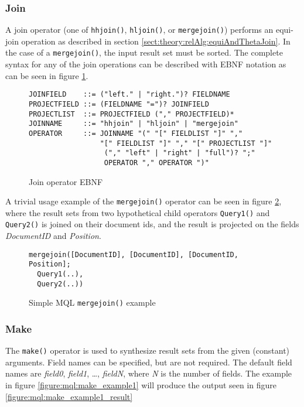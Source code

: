 \subsubsection{Join}
A join operator (one of \texttt{hhjoin()}, \texttt{hljoin()}, or
\texttt{mergejoin()}) performs an equi-join operation as described in section
\ref{sect:theory:relAlg:equiAndThetaJoin}. In the case of a
\texttt{mergejoin()}, the input result set must be sorted. The complete syntax
for any of the join operations can be described with EBNF notation as can be
seen in figure \ref{figure:mql:ebnf:join}.
\begin{figure}[!h]
\centering
\begin{Verbatim}
JOINFIELD    ::= ("left." | "right.")? FIELDNAME
PROJECTFIELD ::= (FIELDNAME "=")? JOINFIELD
PROJECTLIST  ::= PROJECTFIELD ("," PROJECTFIELD)*
JOINNAME     ::= "hhjoin" | "hljoin" | "mergejoin"
OPERATOR     ::= JOINNAME "(" "[" FIELDLIST "]" "," 
                 "[" FIELDLIST "]" "," "[" PROJECTLIST "]"
                  ("," "left" | "right" | "full")? ";"
                  OPERATOR "," OPERATOR ")"
\end{Verbatim}
\caption{Join operator EBNF}
\label{figure:mql:ebnf:join}
\end{figure}
A trivial usage example of the \texttt{mergejoin()} operator can be seen in
figure \ref{figure:mql:mergejoin_example}, where the result sets from two
hypothetical child operators \texttt{Query1()} and \texttt{Query2()} is joined
on their document ids, and the result is projected on the
fields \textit{DocumentID} and \textit{Position}.

\begin{figure}[!h]
\centering
\begin{Verbatim}
mergejoin([DocumentID], [DocumentID], [DocumentID, Position]; 
  Query1(..),
  Query2(..))
\end{Verbatim}
\caption{Simple MQL \texttt{mergejoin()} example}
\label{figure:mql:mergejoin_example}
\end{figure}


\subsubsection{Make}
The \texttt{make()} operator is used to synthesize result sets from the given
(constant) arguments. Field names can be specified, but are not required. The
default field names are \textit{field0}, \textit{field1}, \ldots,
\textit{fieldN}, where \textit{N} is the number of fields. The example in
figure \ref{figure:mql:make_example1} will produce the output seen in figure
\ref{figure:mql:make_example1_result}

